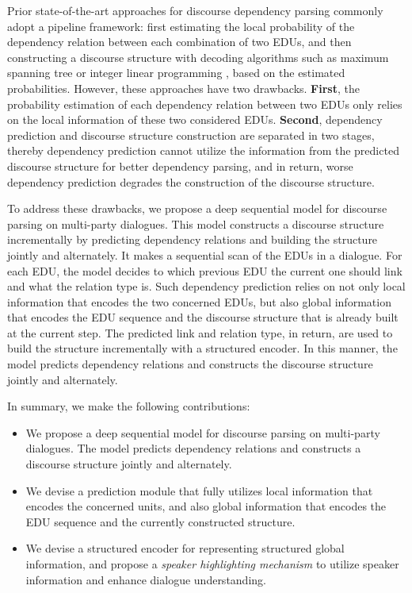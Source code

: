 \documentclass[letterpaper]{article} \usepackage{aaai19}  \usepackage{times}  \usepackage{helvet}  \usepackage{courier}  \usepackage{url}  \usepackage{graphicx}  \usepackage{amssymb}
\begin{document}
Prior state-of-the-art approaches for discourse dependency parsing commonly adopt a pipeline framework: first estimating the local probability of the dependency relation between each combination of two EDUs, and then constructing a discourse structure with decoding algorithms such as maximum spanning tree or integer linear programming \cite{muller2012constrained,li2014text,afantenos2015discourse,perret2016integer}, based on the estimated probabilities.
However, these approaches have two drawbacks. 
\textbf{First}, the probability estimation of each dependency relation
between two EDUs only relies on the local information of these two considered EDUs. 
\textbf{Second}, dependency prediction and discourse structure construction are separated in two stages, thereby dependency prediction cannot utilize the information from the predicted discourse structure for better dependency parsing, and in return, worse dependency prediction degrades the construction of the discourse structure.

To address these drawbacks, we propose a deep sequential model for discourse parsing on multi-party dialogues. 
This model constructs a discourse structure incrementally by predicting dependency relations and building the structure jointly and alternately.
It makes a sequential scan of the EDUs in a dialogue. 
For each EDU, the model decides to which previous EDU the current one should link and what the relation type is. 
Such dependency prediction relies on not only  local information that encodes the two concerned EDUs, but also global information that encodes the EDU sequence and the discourse structure that is already built at the current step. 
The predicted link and relation type, in return, are used to build the structure incrementally with a structured encoder. In this manner, the model predicts dependency relations and constructs the discourse structure jointly and alternately.   

In summary, we make the following contributions:
\begin{itemize}
    \item We propose a deep sequential model for discourse parsing on multi-party dialogues. The model predicts dependency relations and constructs a discourse structure jointly and alternately.
    
    \item We devise a prediction module that fully utilizes local information that encodes the concerned units, and also global information that encodes the EDU sequence and the currently constructed structure. 
   
    \item We devise a structured encoder for representing structured global information, and propose a \emph{speaker highlighting mechanism} to utilize speaker information and enhance dialogue understanding.
\end{itemize}
\end{document}
